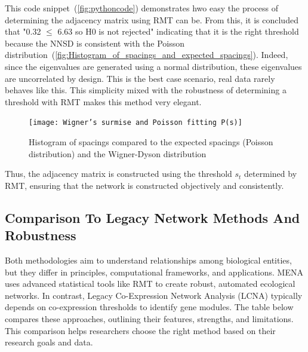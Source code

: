 This code snippet~(\autoref{fig:pythoncode}) demonstrates hwo easy the process of determining the adjacency matrix using RMT can be.
From this, it is concluded that "0.32 $\leq$ 6.63 so H0 is not rejected" indicating that it is the right threshold because the NNSD is consistent with the Poisson distribution~(\autoref{fig:Histogram_of_spacings_and_expected_spacings}).
Indeed, since the eigenvalues are generated using a normal distribution, these eigenvalues are uncorrelated by design.
This is the best case scenario, real data rarely behaves like this.
This simplicity mixed with the robustness of determining a threshold with RMT makes this method very elegant.

\begin{figure}[H]
    \centering
    \texttt{[image: Wigner’s surmise and Poisson fitting P(s)]} %
    \caption{Histogram of spacings compared to the expected spacings (Poisson distribution) and the Wigner-Dyson distribution}
    \label{fig:Histogram_of_spacings_and_expected_spacings}
\end{figure}

\noindent Thus, the adjacency matrix is constructed using the threshold $s_t$ determined by RMT, ensuring that the network is constructed objectively and consistently.

\subsection{Comparison To Legacy Network Methods And Robustness}\label{subsec:comparison-to-legacy-network-methods-and-robustness}

Both methodologies aim to understand relationships among biological entities, but they differ in principles, computational frameworks, and applications.
MENA uses advanced statistical tools like RMT to create robust, automated ecological networks.
In contrast, Legacy Co-Expression Network Analysis (LCNA) typically depends on co-expression thresholds to identify gene modules.
The table below compares these approaches, outlining their features, strengths, and limitations.
This comparison helps researchers choose the right method based on their research goals and data.

